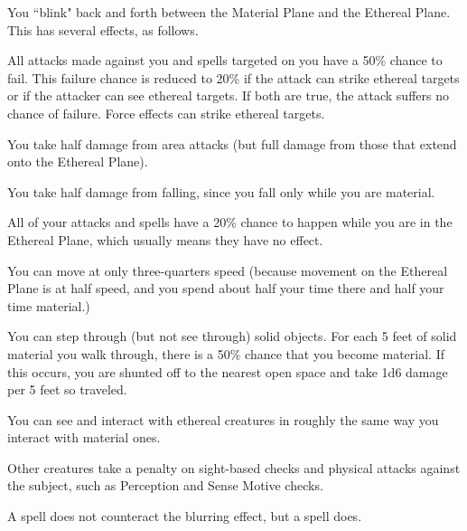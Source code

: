 \spellrng{\rngpers}
\begin{spelleffect}
  You ``blink" back and forth between the Material Plane and the Ethereal Plane. This has several effects, as follows.
  \begin{itemize*}
    \item All attacks made against you and spells targeted on you have a 50\% chance to fail. This failure chance is reduced to 20\% if the attack can strike ethereal targets or if the attacker can see ethereal targets. If both are true, the attack suffers no chance of failure. Force effects can strike ethereal targets.
    \item You take half damage from area attacks (but full damage from those that extend onto the Ethereal Plane).
    \item You take half damage from falling, since you fall only while you are material.
    \item All of your attacks and spells have a 20\% chance to happen while you are in the Ethereal Plane, which usually means they have no effect.
    \item You can move at only three-quarters speed (because movement on the Ethereal Plane is at half speed, and you spend about half your time there and half your time material.)
    \item You can step through (but not see through) solid objects. For each 5 feet of solid material you walk through, there is a 50\% chance that you become material. If this occurs, you are shunted off to the nearest open space and take 1d6 damage per 5 feet so traveled. 
    \item You can see and interact with ethereal creatures in roughly the same way you interact with material ones.
  \end{itemize*}
\end{spelleffect}

\spellrng{\rngclose}
\begin{spellsuccess}
    Other creatures take a  penalty on sight-based checks and physical attacks against the subject, such as Perception and Sense Motive checks.
\end{spellsuccess}
\begin{spellnotes}
  A  spell does not counteract the blurring effect, but a  spell does.
\end{spellnotes}

